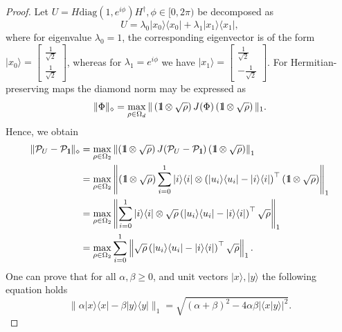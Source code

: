 \documentclass[preprint,12pt, a4paper, dvipsnames]{elsarticle}
\newcommand{\ket}[1]{\ensuremath{|#1\rangle}}
\newcommand{\bra}[1]{\ensuremath{\langle#1|}}
\newcommand{\ketbra}[2]{\ensuremath{\ket{#1}\bra{#2}}}
\newcommand{\proj}[1]{\ensuremath{\ketbra{#1}{#1}}}
\newcommand{\braket}[2]{\ensuremath{\langle{#1}|{#2}\rangle}}
\newcommand{\1}{{\rm 1\hspace{-0.9mm}l}}
\newcommand{\Id}{{\rm 1\hspace{-0.9mm}l}}
\newcommand{\PP}{\mathcal{P}}
\newcommand{\diag}{\mathrm{diag}}
\theoremstyle{definition}
\begin{document}
\begin{proof}
	Let $U = H\diag(1, e^{i \phi}) H^\dagger, \phi \in [0,
	2\pi)$ be decomposed as
	\begin{equation}
	U= \lambda_0 \ketbra{x_0}{x_0} + \lambda_1 \ketbra{x_1}{x_1},
	\end{equation}
	where  for eigenvalue $\lambda_0 = 1$, the corresponding
	eigenvector is
	of the form $\ket{x_0} = \left[\begin{array}{c}\frac{1}{\sqrt{2}}\\\frac{1}{\sqrt{2}}\end{array}\right]
	$,
	whereas for  $\lambda_1 = e^{i \phi}$ we have $\ket{x_1} = \left[\begin{array}{c}\frac{1}{\sqrt{2}}\\-\frac{1}{\sqrt{2}}\end{array}\right]
	$.
	For Hermitian-preserving maps \cite{watrous} the diamond norm may be expressed as
	\begin{equation}
	\| \Phi  \|_\diamond =  \max_{\rho \in \Omega_d} \| \left( \Id \otimes \sqrt{\rho} \right) J(\Phi)  \left( \Id \otimes \sqrt{\rho} \right)  \|_1.  \end{equation}
	Hence, we obtain
	\begin{equation}
	\begin{split}
	\| \PP_{U} - \PP_{\Id}  \|_\diamond
	& =  \max_{\rho \in \Omega_2} \left\| \left( \Id \otimes \sqrt{\rho} \right)
	J(\PP_{U} - \PP_{\Id} )  \left( \Id \otimes \sqrt{\rho} \right)  \right\|_1
	\\
	& =  \max_{\rho \in \Omega_2} \left\| \left( \Id \otimes \sqrt{\rho} \right)
	\sum_{i=0}^{1} \proj{i} \otimes \left( \proj{u_i} - \proj{i} \right)^\top
\left( \Id \otimes \sqrt{\rho} \right) 	\right\|_1  \\
	& = \max_{\rho \in \Omega_2} \left\| \sum_{i=0}^{1} \proj{i} \otimes
	\sqrt{\rho}  \left( \proj{u_i} - \proj{i} \right)^\top \sqrt{\rho}  \right\|_1
	\\
	& = \max_{\rho \in \Omega_2} \sum_{i=0}^{1} \left\| \sqrt{\rho}  \left(
	\proj{u_i} - \proj{i} \right)^\top \sqrt{\rho}  \right\|_1.
	\end{split}
	\end{equation}
	One can prove that for all $\alpha, \beta \ge 0 $, and unit vectors $\ket{x},
	\ket{y}$ the following equation holds~\cite{watrous}
	\begin{equation}
	\| \alpha \proj{x} - \beta\proj{y} \|_1 = \sqrt{(\alpha + \beta)^2 - 4\alpha
		\beta |\braket{x}{y}|^2}.
	\end{equation}

\end{proof}
\end{document}
